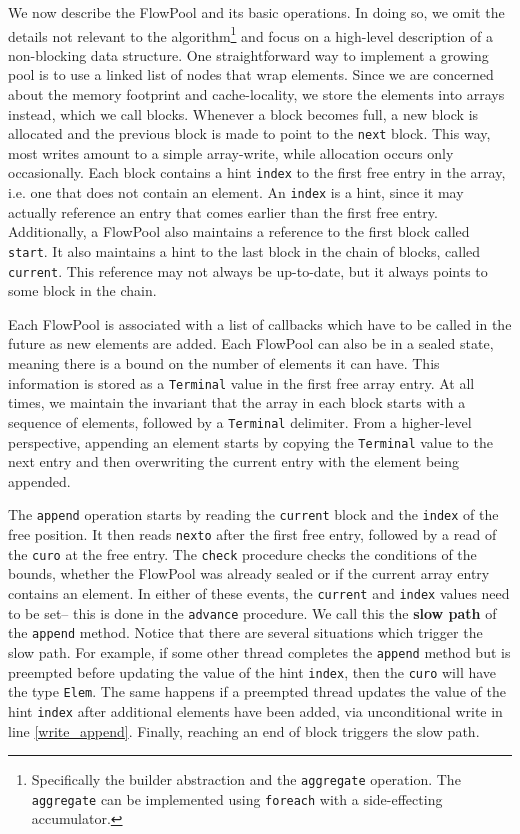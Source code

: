 We now describe the FlowPool and its basic operations.
In doing so, we omit the details not relevant to the
algorithm\footnote{Specifically the builder abstraction and the \texttt{aggregate}
operation. The \texttt{aggregate} can be implemented using \texttt{foreach}
with a side-effecting accumulator.}
and focus on a high-level description of a non-blocking
data structure.
One straightforward way to implement a growing pool is to use a linked
list of nodes that wrap elements.
Since we are concerned about the memory footprint and cache-locality, we
store the elements into arrays instead, which we call blocks.
Whenever a block becomes full, a new block is allocated and the
previous block is made to point to the \verb=next= block.
This way, most writes amount to a simple array-write, while allocation
occurs only occasionally.
Each block contains a hint \verb=index= to the first free entry in
the array, i.e. one that does not contain an element.
An \verb=index= is a hint, since it may actually reference an entry
that comes earlier than the first free entry.
Additionally, a FlowPool also maintains a reference to the first block called
\verb=start=.
It also maintains a hint to the last block in the chain of blocks,
called \verb=current=.
This reference may not always be up-to-date, but it always points
to some block in the chain.

Each FlowPool is associated with a list of callbacks which have
to be called in the future as new elements are added.
Each FlowPool can also be in a sealed state, meaning there is a bound on
the number of elements it can have.
This information is stored as a \verb=Terminal= value in the first
free array entry.
At all times, we maintain the invariant that the array in each block
starts with a sequence of elements, followed by a \verb=Terminal=
delimiter. From a higher-level perspective, appending an element
starts by copying the \verb=Terminal= value to the next entry and then
overwriting the current entry with the element being appended.

The \verb=append= operation starts by reading the \verb=current= block
and the \verb=index= of the free position.
It then reads
\verb=nexto= after the first free entry, followed by a read of the
\verb=curo= at the free entry.
The \verb=check= procedure checks the conditions of the bounds, whether the
FlowPool was already sealed or if the current array entry contains an
element.
In either of these events, the \verb=current= and \verb=index= values
need to be set-- this is done in the \verb=advance= procedure.
We call this the \textbf{slow path} of the \verb=append= method.
Notice that there are several situations which trigger the slow path.
For example, if some other thread completes the \verb=append= method but is
preempted before updating the value of the hint \verb=index=, then the
\verb=curo= will have the type \verb=Elem=.
The same happens if a preempted thread updates the value of the
hint \verb=index= after additional elements have been added,
via unconditional write in line \ref{write_append}.
Finally, reaching an end of block triggers the slow path.

